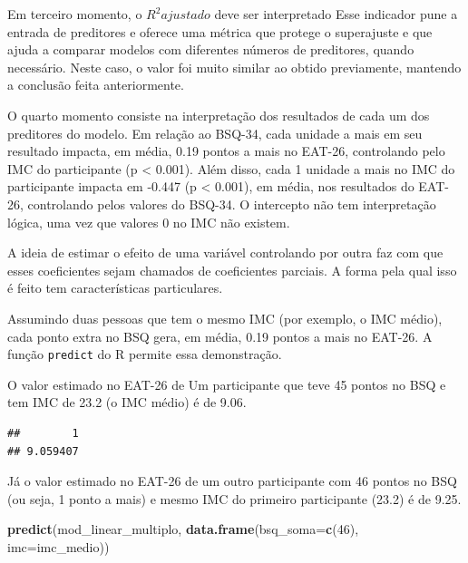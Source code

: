 \documentclass[
]{book}
\newenvironment{Shaded}{\begin{snugshade}}{\end{snugshade}}
\newcommand{\DataTypeTok}[1]{\textcolor[rgb]{0.13,0.29,0.53}{#1}}
\newcommand{\DecValTok}[1]{\textcolor[rgb]{0.00,0.00,0.81}{#1}}
\newcommand{\KeywordTok}[1]{\textcolor[rgb]{0.13,0.29,0.53}{\textbf{#1}}}
\newcommand{\NormalTok}[1]{#1}
\newcommand{\OperatorTok}[1]{\textcolor[rgb]{0.81,0.36,0.00}{\textbf{#1}}}
\newcommand{\StringTok}[1]{\textcolor[rgb]{0.31,0.60,0.02}{#1}}
\begin{document}
Em terceiro momento, o \(R^2 ajustado\) deve ser interpretado Esse indicador pune a entrada de preditores e oferece uma métrica que protege o superajuste e que ajuda a comparar modelos com diferentes números de preditores, quando necessário. Neste caso, o valor foi muito similar ao obtido previamente, mantendo a conclusão feita anteriormente.

O quarto momento consiste na interpretação dos resultados de cada um dos preditores do modelo. Em relação ao BSQ-34, cada unidade a mais em seu resultado impacta, em média, 0.19 pontos a mais no EAT-26, controlando pelo IMC do participante (p \textless{} 0.001). Além disso, cada 1 unidade a mais no IMC do participante impacta em -0.447 (p \textless{} 0.001), em média, nos resultados do EAT-26, controlando pelos valores do BSQ-34. O intercepto não tem interpretação lógica, uma vez que valores 0 no IMC não existem.

A ideia de estimar o efeito de uma variável controlando por outra faz com que esses coeficientes sejam chamados de coeficientes parciais. A forma pela qual isso é feito tem características particulares.

Assumindo duas pessoas que tem o mesmo IMC (por exemplo, o IMC médio), cada ponto extra no BSQ gera, em média, 0.19 pontos a mais no EAT-26. A função \texttt{predict} do R permite essa demonstração.

O valor estimado no EAT-26 de Um participante que teve 45 pontos no BSQ e tem IMC de 23.2 (o IMC médio) é de 9.06.

\begin{Shaded}
\end{Shaded}

\begin{verbatim}
##        1 
## 9.059407
\end{verbatim}

Já o valor estimado no EAT-26 de um outro participante com 46 pontos no BSQ (ou seja, 1 ponto a mais) e mesmo IMC do primeiro participante (23.2) é de 9.25.

\begin{Shaded}
\begin{Highlighting}[]
\KeywordTok{predict}\NormalTok{(mod_linear_multiplo, }\KeywordTok{data.frame}\NormalTok{(}\DataTypeTok{bsq_soma=}\KeywordTok{c}\NormalTok{(}\DecValTok{46}\NormalTok{), }\DataTypeTok{imc=}\NormalTok{imc_medio))}
\end{Highlighting}
\end{Shaded}
\end{document}
